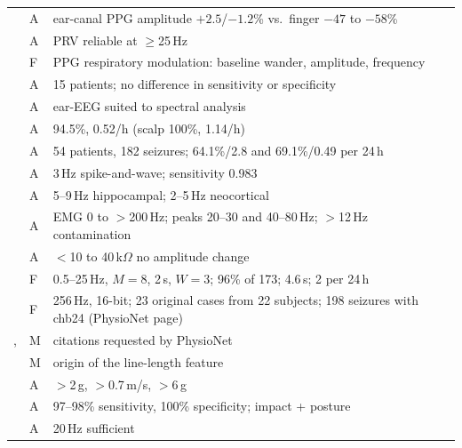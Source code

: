\documentclass[10pt,a4paper]{article}
\begin{document}
\begin{longtable}{L{3.4cm}L{0.8cm}L{10.9cm}}
\textcite{budidha2014} & A & ear-canal PPG amplitude $+2.5$/$-1.2$\% vs.\ finger $-47$ to $-58$\% \\
\textcite{choi2017} & A & PRV reliable at $\ge$25\,Hz \\
\textcite{charlton2018} & F & PPG respiratory modulation: baseline wander, amplitude, frequency \\
\textcite{zibrandtsen2017} & A & 15 patients; no difference in sensitivity or specificity \\
\textcite{mikkelsen2015} & A & ear-EEG suited to spectral analysis \\
\textcite{gu2018} & A & 94.5\%, 0.52/h (scalp 100\%, 1.14/h) \\
\textcite{vandecasteele2020} & A & 54 patients, 182 seizures; 64.1\%/2.8 and 69.1\%/0.49 per 24\,h \\
\textcite{swinnen2021} & A & 3\,Hz spike-and-wave; sensitivity 0.983 \\
\textcite{ebersole1996} & A & 5--9\,Hz hippocampal; 2--5\,Hz neocortical \\
\textcite{goncharova2003} & A & EMG 0 to $>$200\,Hz; peaks 20--30 and 40--80\,Hz; $>$12\,Hz contamination \\
\textcite{ferree2001} & A & $<$10 to 40\,k$\Omega$ no amplitude change \\
\textcite{shoeb2010} & F & 0.5--25\,Hz, $M=8$, 2\,s, $W=3$; 96\% of 173; 4.6\,s; 2 per 24\,h \\
\textcite{chbmit2010} & F & 256\,Hz, 16-bit; 23 original cases from 22 subjects; 198 seizures with chb24 (PhysioNet page) \\
\textcite{shoeb2009}, \textcite{goldberger2000} & M & citations requested by PhysioNet \\
\textcite{esteller2001} & M & origin of the line-length feature \\
\textcite{lindemann2005} & A & $>$2\,g, $>$0.7\,m/s, $>$6\,g \\
\textcite{kangas2008} & A & 97--98\% sensitivity, 100\% specificity; impact + posture \\
\textcite{villa2025} & A & 20\,Hz sufficient \\
\end{longtable}
\endgroup

\printbibliography[heading=bibintoc]
\end{document}

